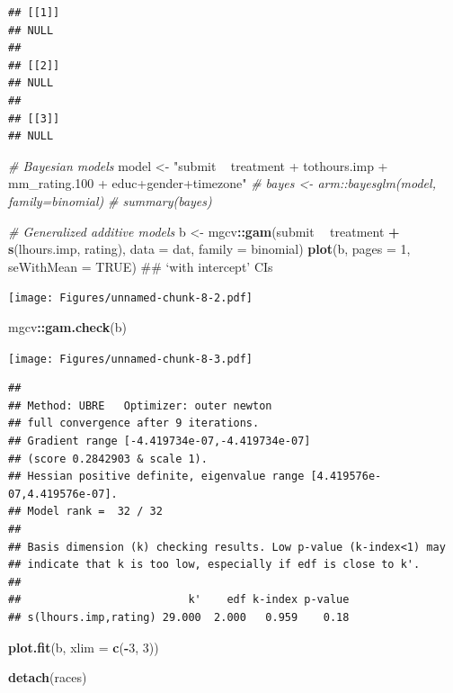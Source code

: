 \documentclass[]{article}
\newenvironment{Shaded}{\begin{snugshade}}{\end{snugshade}}
\newcommand{\KeywordTok}[1]{\textcolor[rgb]{0.13,0.29,0.53}{\textbf{#1}}}
\newcommand{\DataTypeTok}[1]{\textcolor[rgb]{0.13,0.29,0.53}{#1}}
\newcommand{\DecValTok}[1]{\textcolor[rgb]{0.00,0.00,0.81}{#1}}
\newcommand{\StringTok}[1]{\textcolor[rgb]{0.31,0.60,0.02}{#1}}
\newcommand{\CommentTok}[1]{\textcolor[rgb]{0.56,0.35,0.01}{\textit{#1}}}
\newcommand{\OtherTok}[1]{\textcolor[rgb]{0.56,0.35,0.01}{#1}}
\newcommand{\OperatorTok}[1]{\textcolor[rgb]{0.81,0.36,0.00}{\textbf{#1}}}
\newcommand{\NormalTok}[1]{#1}
\let\oldShaded\Shaded
\let\endoldShaded\endShaded
\renewenvironment{Shaded}{\footnotesize\oldShaded}{\endoldShaded}
\begin{document}
\begin{verbatim}
## [[1]]
## NULL
## 
## [[2]]
## NULL
## 
## [[3]]
## NULL
\end{verbatim}

\begin{Shaded}
\begin{Highlighting}[]
\CommentTok{# Bayesian models}
\NormalTok{model <-}\StringTok{ "submit ~ treatment + tothours.imp + mm_rating.100 + educ+gender+timezone"}
\CommentTok{# bayes <- arm::bayesglm(model, family=binomial)}
\CommentTok{# summary(bayes)}

\CommentTok{# Generalized additive models}
\NormalTok{b <-}\StringTok{ }\NormalTok{mgcv}\OperatorTok{::}\KeywordTok{gam}\NormalTok{(submit }\OperatorTok{~}\StringTok{ }\NormalTok{treatment }\OperatorTok{+}\StringTok{ }\KeywordTok{s}\NormalTok{(lhours.imp, rating), }\DataTypeTok{data =}\NormalTok{ dat, }
    \DataTypeTok{family =}\NormalTok{ binomial)}
\KeywordTok{plot}\NormalTok{(b, }\DataTypeTok{pages =} \DecValTok{1}\NormalTok{, }\DataTypeTok{seWithMean =} \OtherTok{TRUE}\NormalTok{)  ## `with intercept' CIs}
\end{Highlighting}
\end{Shaded}

\texttt{[image: Figures/unnamed-chunk-8-2.pdf]}

\begin{Shaded}
\begin{Highlighting}[]
\NormalTok{mgcv}\OperatorTok{::}\KeywordTok{gam.check}\NormalTok{(b)}
\end{Highlighting}
\end{Shaded}

\texttt{[image: Figures/unnamed-chunk-8-3.pdf]}

\begin{verbatim}
## 
## Method: UBRE   Optimizer: outer newton
## full convergence after 9 iterations.
## Gradient range [-4.419734e-07,-4.419734e-07]
## (score 0.2842903 & scale 1).
## Hessian positive definite, eigenvalue range [4.419576e-07,4.419576e-07].
## Model rank =  32 / 32 
## 
## Basis dimension (k) checking results. Low p-value (k-index<1) may
## indicate that k is too low, especially if edf is close to k'.
## 
##                          k'    edf k-index p-value
## s(lhours.imp,rating) 29.000  2.000   0.959    0.18
\end{verbatim}

\begin{Shaded}
\begin{Highlighting}[]
\KeywordTok{plot.fit}\NormalTok{(b, }\DataTypeTok{xlim =} \KeywordTok{c}\NormalTok{(}\OperatorTok{-}\DecValTok{3}\NormalTok{, }\DecValTok{3}\NormalTok{))}

\KeywordTok{detach}\NormalTok{(races)}
\end{Highlighting}
\end{Shaded}
\end{document}
